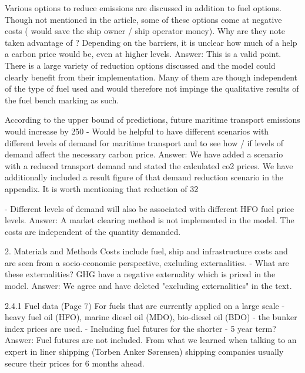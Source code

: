 Various options to reduce emissions are discussed in addition to fuel options. Though not mentioned in the article, some of these options come at negative costs ( would save the ship owner / ship operator money). Why are they note taken advantage of ? Depending on the barriers, it is unclear how much of a help a carbon price would be, even at higher levels.
Answer: This is a valid point. There is a large variety of reduction options discussed and the model could clearly benefit from their implementation. Many of them are though independent of the type of fuel used and would therefore not impinge the qualitative results of the fuel bench marking as such.
 
According to the upper bound of predictions, future maritime transport emissions would increase by 250%
-	Would be helpful to have different scenarios with different levels of demand for maritime transport and to see how / if levels of demand affect the necessary carbon price.
Answer: We have added a scenario with a reduced transport demand and stated the calculated co2 prices. We have additionally included a result figure of that demand reduction scenario in the appendix. It is worth mentioning that reduction of 32%

-	Different levels of demand will also be associated with different HFO fuel price levels.
Answer: A market clearing method is not implemented in the model. The costs are independent of the quantity demanded.

2. Materials and Methods
Costs include fuel, ship and infrastructure costs and are seen from a socio-economic perspective, excluding externalities. 
-       What are these externalities? GHG have a negative externality which is priced in the model.
Answer: We agree and have deleted "excluding externalities" in the text.

2.4.1 Fuel data (Page 7)
For fuels that are currently applied on a large scale - heavy fuel oil (HFO), marine diesel oil (MDO), bio-diesel oil (BDO) - the bunker index prices are used.
-	Including fuel futures for the shorter - 5 year term?
Answer: Fuel futures are not included. From what we learned when talking to an expert in liner shipping (Torben Anker Sørensen) shipping companies usually secure their prices for 6 months ahead.

